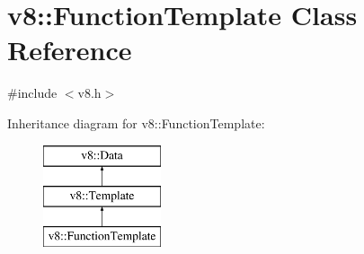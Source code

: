 \hypertarget{classv8_1_1_function_template}{}\section{v8\+:\+:Function\+Template Class Reference}
\label{classv8_1_1_function_template}


{\ttfamily \#include $<$v8.\+h$>$}

Inheritance diagram for v8\+:\+:Function\+Template\+:\begin{figure}[H]
\begin{center}
\leavevmode
\includegraphics[height=3.000000cm]{classv8_1_1_function_template}
\end{center}
\end{figure}
